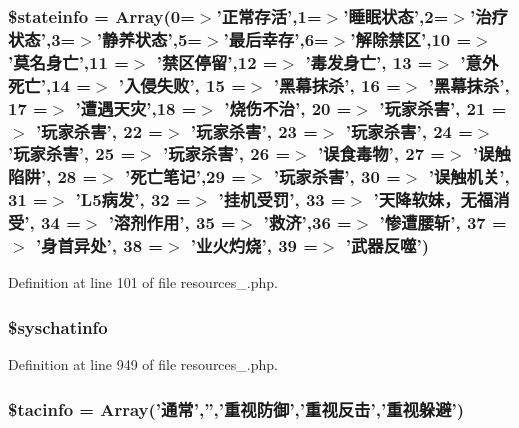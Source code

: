\hypertarget{cache_2resources__1_8php_a014f40ed69f3ce2bd7a3263f5b5c9d91}{
\subsubsection[{\$stateinfo}]{\setlength{\rightskip}{0pt plus 5cm}\$stateinfo = Array(0=$>$'正常存活',1=$>$'睡眠状态',2=$>$'治疗状态',3=$>$'静养状态',5=$>$'最后幸存',6=$>$'解除禁区',10 =$>$ '莫名身亡',11 =$>$ '禁区停留',12 =$>$ '毒发身亡', 13 =$>$ '意外死亡',14 =$>$ '入侵失败', 15 =$>$ '黑幕抹杀', 16 =$>$ '黑幕抹杀', 17 =$>$ '遭遇天灾',18 =$>$ '烧伤不治', 20 =$>$ '玩家杀害', 21 =$>$ '玩家杀害', 22 =$>$ '玩家杀害', 23 =$>$ '玩家杀害', 24 =$>$ '玩家杀害', 25 =$>$ '玩家杀害', 26 =$>$ '误食毒物', 27 =$>$ '误触陷阱', 28 =$>$ '死亡笔记',29 =$>$ '玩家杀害', 30 =$>$ '误触机关', 31 =$>$ 'L5病发', 32 =$>$ '挂机受罚', 33 =$>$ '天降软妹，无福消受', 34 =$>$ '溶剂作用', 35 =$>$ '救济',36 =$>$ '惨遭腰斩', 37 =$>$ '身首异处', 38 =$>$ '业火灼烧', 39 =$>$ '武器反噬')}}\label{cache_2resources__1_8php_a014f40ed69f3ce2bd7a3263f5b5c9d91}


Definition at line 101 of file resources\+\_.\+php.

\hypertarget{cache_2resources__1_8php_ac8bce71e872b69086880bde6d22e8a8c}{
\subsubsection[{\$syschatinfo}]{\setlength{\rightskip}{0pt plus 5cm}\$syschatinfo}}\label{cache_2resources__1_8php_ac8bce71e872b69086880bde6d22e8a8c}


Definition at line 949 of file resources\+\_.\+php.

\hypertarget{cache_2resources__1_8php_aed45c4ff2bc7ce0af6c4b05414cd1373}{
\subsubsection[{\$tacinfo}]{\setlength{\rightskip}{0pt plus 5cm}\$tacinfo = Array('通常','','重视防御','重视反击','重视躲避')}}\label{cache_2resources__1_8php_aed45c4ff2bc7ce0af6c4b05414cd1373}


